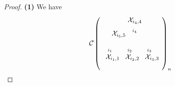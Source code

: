 \documentclass[10pt]{amsart}
\theoremstyle{break}
\begin{document}
\begin{proof}
{\bf (1)}
We have
\begin{eqnarray*}
&&{{\mathcal{C}}}\acute{}\left( 
\unitlength 0.1in
\begin{picture}(12.500,6.0)(0.00,-6.00)
\special{pn 8}\special{pa 200 800}\special{pa 223 766}\special{pa 245 733}\special{pa 268 702}\special{pa 291 674}\special{pa 313 648}\special{pa 336 628}\special{pa 358 612}\special{pa 381 603}\special{pa 404 600}\special{pa 426 605}\special{pa 449 616}\special{pa 472 634}\special{pa 494 656}\special{pa 517 682}\special{pa 539 712}\special{pa 562 744}\special{pa 585 777}\special{pa 600 800}\special{sp}\special{pn 8}\special{pa 461 455}\special{pa 521 515}\special{sp}\special{pn 8}\special{pa 400 600}\special{pa 423 570}\special{pa 445 540}\special{pa 468 512}\special{pa 491 485}\special{pa 513 461}\special{pa 536 440}\special{pa 558 422}\special{pa 581 408}\special{pa 604 399}\special{pa 626 395}\special{pa 649 395}\special{pa 672 400}\special{pa 694 409}\special{pa 717 423}\special{pa 739 439}\special{pa 762 460}\special{pa 785 483}\special{pa 807 509}\special{pa 830 537}\special{pa 853 568}\special{pa 875 600}\special{pa 898 634}\special{pa 920 669}\special{pa 943 706}\special{pa 966 743}\special{pa 988 781}\special{pa 1000 800}\special{sp}\special{pn 8}\special{pa 637 195}\special{pa 637 395}\special{fp}\special{sh 1}\special{pa 637 195}\special{pa 617 263}\special{pa 637 249}\special{pa 657 263}\special{pa 637 195}\special{fp}\special{sh 1}\special{pa 637 395}\special{pa 567 397}\special{pa 586 412}\special{pa 580 435}\special{pa 637 395}\special{fp}\special{sh 1}\special{pa 637 395}\special{pa 694 435}\special{pa 688 412}\special{pa 707 397}\special{pa 637 395}\special{fp}\special{sh 1}\special{pa 400 600}\special{pa 330 602}\special{pa 349 617}\special{pa 343 640}\special{pa 400 600}\special{fp}\special{sh 1}\special{pa 400 600}\special{pa 457 640}\special{pa 451 617}\special{pa 470 602}\special{pa 400 600}\special{fp}\put(7.0000,-3.250000){\makebox(0,0){${}^{i_4}$}}\put(10.0000,-7.0000){\makebox(0,0){${}_{i_3}$}}\put(2.0000,-7.0000){\makebox(0,0){${}_{i_1}$}}\put(6.0000,-7.0000){\makebox(0,0){${}_{i_2}$}}\put(7.0000,-1.0000){\makebox(0,0){$\mathcal{X}_{{i_4,4}}$}}\put(3.750000,-3.750000){\makebox(0,0){$\mathcal{X}_{{i_5,5}}$}}\put(10.50000,-8.50000){\makebox(0,0){$\mathcal{X}_{{i_3,3}}$}}\put(2.5000,-8.50000){\makebox(0,0){$\mathcal{X}_{{i_1,1}}$}}\put(6.50000,-8.50000){\makebox(0,0){$\mathcal{X}_{{i_2,2}}$}}\end{picture}
\right)_n \\[-0.1em]

\end{eqnarray*}
\end{proof}
\end{document}
